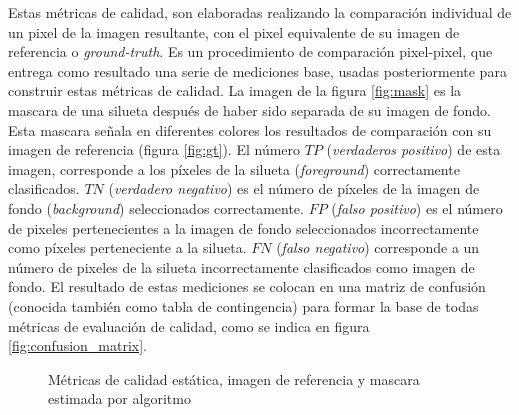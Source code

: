 Estas métricas de calidad, son elaboradas realizando la comparación individual de un pixel de la imagen resultante, con el pixel equivalente de su imagen de referencia o \emph{ground-truth}. Es un procedimiento de comparación pixel-pixel, que entrega como resultado una serie de mediciones base, usadas posteriormente para construir estas métricas de calidad. La imagen de la figura \ref{fig:mask} es la mascara de una silueta después de haber sido separada de su imagen de fondo. Esta mascara señala en diferentes colores los resultados de comparación con su imagen de referencia (figura \ref{fig:gt}). El número $TP$ (\emph{verdaderos positivo}) de esta imagen, corresponde a los píxeles de la silueta (\emph{foreground}) correctamente clasificados. $TN$ (\emph{verdadero negativo}) es el número de píxeles de la imagen de fondo (\emph{background}) seleccionados correctamente. $FP$ (\emph{falso positivo}) es el número de pixeles pertenecientes a la imagen de fondo seleccionados incorrectamente como píxeles perteneciente a la silueta. $FN$ (\emph{falso negativo}) corresponde a un número de pixeles de la silueta incorrectamente clasificados como imagen de fondo. El resultado de estas mediciones se colocan en una matriz de confusión (conocida también como tabla de contingencia) para formar la base de todas métricas de evaluación de calidad, como se indica en figura \ref{fig:confusion_matrix}. 

\begin{figure}
\centering     %
{}
\label{fig:metricas_calidad_estatica}
\caption[Métricas de calidad estática]{Métricas de calidad estática, imagen de referencia y mascara estimada por algoritmo}
\end{figure}

